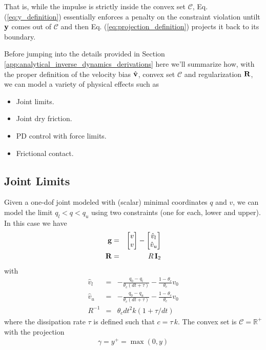 That is, while the impulse is strictly inside the convex set $\mathcal{C}$, Eq.
(\ref{eq:y_definition}) essentially enforces a penalty on the constraint
violation untilt ${\mathbf{y}}$ comes out of $\mathcal{C}$ and then Eq.
(\ref{eq:projection_definition}) projects it back to its boundary.

Before jumping into the details provided in Section
\ref{app:analytical_inverse_dynamics_derivations} here we'll summarize how, with
the proper definition of the velocity bias $\hat{{\mathbf{v}}}$, convex set
$\mathcal{C}$ and regularization ${\mathbf{R}}$, we can model a variety of physical
effects such as
\begin{itemize}
	\item Joint limits.
	\item Joint dry friction.
	\item PD control with force limits.
	\item Frictional contact.
\end{itemize}

\subsection{Joint Limits}

Given a one-dof joint modeled with (scalar) minimal coordinates $q$ and $v$, we
can model the limit $q_l < q < q_u $ using two constraints (one for each, lower
and upper). In this case we have
\begin{eqnarray}
	{\mathbf{g}} &=&
	\begin{bmatrix}
		v\\
		v\\
	\end{bmatrix} -
	\begin{bmatrix}
		\hat{v}_l\\
		\hat{v}_u\\
	\end{bmatrix}\\
	{\mathbf{R}} &=& R\,{\mathbf{I}}_2
\end{eqnarray}
with
\begin{eqnarray}
	\hat{v}_l&=&-\frac{q_0-q_l}{\theta_c(dt+\tau)}-\frac{1-\theta_c}{\theta_c}v_0\\
	\hat{v}_u&=&-\frac{q_0-q_u}{\theta_c(dt+\tau)}-\frac{1-\theta_c}{\theta_c}v_0\\
	R^{-1}&=&\theta_c dt^2 k(1+\tau/dt)
\end{eqnarray}
where the dissipation rate $\tau$ is defined such that $c=\tau\,k$. The convex
set is $\mathcal{C}=\mathbb{R}^+$ with the projection
\begin{eqnarray}
	\gamma = y^+= \max(0, y)
\end{eqnarray}


